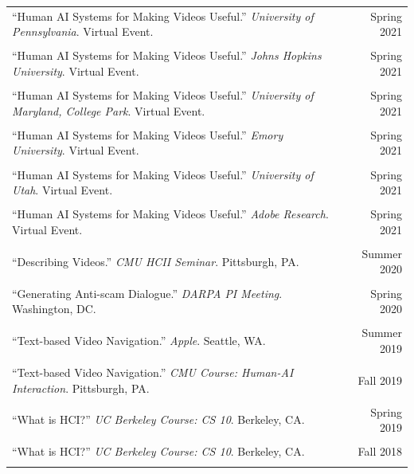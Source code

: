 \begin{longtable}{Xr}
	``Human AI Systems for Making Videos Useful.'' \textit{University of Pennsylvania}. Virtual Event. & Spring 2021 \\
	\\

	``Human AI Systems for Making Videos Useful.'' \textit{Johns Hopkins University}. Virtual Event. & Spring 2021 \\
	\\

	``Human AI Systems for Making Videos Useful.'' \textit{University of Maryland, College Park}. Virtual Event. & Spring 2021 \\
	\\

	``Human AI Systems for Making Videos Useful.'' \textit{Emory University}. Virtual Event. & Spring 2021 \\
	\\

	``Human AI Systems for Making Videos Useful.'' \textit{University of Utah}. Virtual Event. & Spring 2021 \\
	\\

	``Human AI Systems for Making Videos Useful.'' \textit{Adobe Research}. Virtual Event. & Spring 2021 \\
	\\

	``Describing Videos.'' \textit{CMU HCII Seminar}. Pittsburgh, PA. & Summer 2020 \\
	\\

	``Generating Anti-scam Dialogue.'' \textit{DARPA PI Meeting}. Washington, DC. & Spring 2020 \\
	\\

	``Text-based Video Navigation.'' \textit{Apple}. Seattle, WA. & Summer 2019 \\
	\\

	``Text-based Video Navigation.'' \textit{CMU Course: Human-AI Interaction}. Pittsburgh, PA. & Fall 2019 \\
	\\

	``What is HCI?'' \textit{UC Berkeley Course: CS 10}. Berkeley, CA. & Spring 2019 \\
	\\

	``What is HCI?'' \textit{UC Berkeley Course: CS 10}. Berkeley, CA. & Fall 2018 \\
	\\


\end{longtable}
